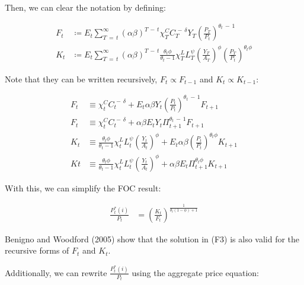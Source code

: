 \documentclass[12pt]{article}
\begin{document}
Then, we can clear the notation by defining:

\begin{align*}
    F_{t} &\coloneqq E_{t}\sum_{T\,=\,t}^{\infty}\left(\alpha\beta\right)^{T\,-\,t}\chi_{T}^{C}C_{T}^{\,-\,\delta}Y_{T}\left(\frac{P_{T}}{P_{t}}\right)^{\theta_{t}\,-\,1}\\
    K_{t} &\coloneqq E_{t}\sum_{T\,=\,t}^{\infty}\left(\alpha\beta\right)^{T\,-\,t}\!\frac{\theta_{t}\phi}{\theta_{t}-1}\chi_{T}^{L}L_{T}^{\psi}\left(\frac{Y_{T}}{A_{T}}\right)^{\phi}\left(\frac{P_{T}}{P_{t}}\right)^{\theta_{t}\phi}
\end{align*}

Note that they can be written recursively, $F_t \propto F_{t-1}$ and $K_t \propto K_{t-1}$:

\begin{align*}
    F_{t} &\equiv \chi_{t}^{C}C_{t}^{\,-\,\delta} +  E_{t}\alpha\beta Y_{t}\left(\frac{P_{t}}{P_{t}}\right)^{\theta_{t}\,-\,1}F_{t+1}\\
    F_{t} &\equiv \chi_{t}^{C}C_{t}^{\,-\,\delta} +  \alpha\beta E_{t}Y_{t}\Pi_{t+1}^{\theta_{t}\,-\,1}F_{t+1} \tag{8}\\
    K_{t} &\equiv \frac{\theta_{t}\phi}{\theta_{t}-1}\chi_{t}^{L}L_{t}^{\psi}\left(\frac{Y_{t}}{A_{t}}\right)^{\phi} + E_t \alpha\beta \left(\frac{P_{t}}{P_{t}}\right)^{\theta_{t}\phi}K_{t+1}\\
    K{t} &\equiv \frac{\theta_{t}\phi}{\theta_{t}-1}\chi_{t}^{L}L_{t}^{\psi}\left(\frac{Y_{t}}{A_{t}}\right)^{\phi} + \alpha\beta E_t \Pi_{t+1}^{\theta_{t}\phi}K_{t+1} \tag{9}
\end{align*}

With this, we can simplify the FOC result:

\begin{align*}
    \frac{P^*_{t}(i)}{P_{t}} &= \left(\frac{K_t}{F_t}\right)^\frac{1}{\theta_t(1-\phi)+1} \tag{F3}
\end{align*}

Benigno and Woodford (2005) show that the solution in (F3) is also valid for the recursive forms of $F_t$ and $K_t$. %

Additionally, we can rewrite $\frac{P^*_{t}(i)}{P_{t}}$ using the aggregate price equation:
\end{document}
